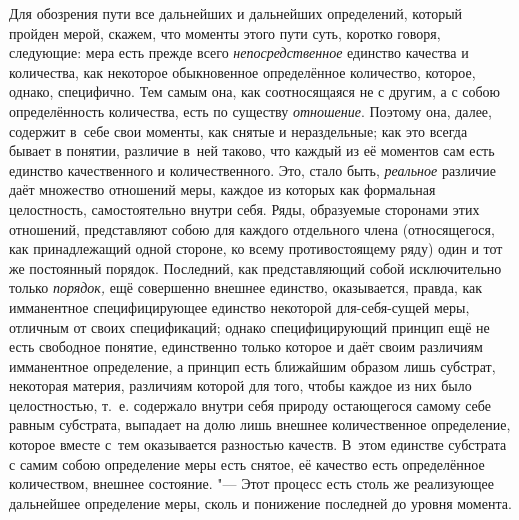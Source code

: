 Для обозрения пути все дальнейших и дальнейших определений, который пройден
мерой, скажем, что моменты этого пути суть, коротко говоря, следующие: мера
есть прежде всего {\em непосредственное} единство качества и количества, как
некоторое обыкновенное определённое количество, которое, однако, специфично.
Тем самым она, как соотносящаяся не с другим, а с собою определённость
количества, есть по существу {\em отношение}. Поэтому она, далее, содержит
в~себе свои моменты, как снятые и нераздельные; как это всегда бывает
в понятии, различие в~ней таково, что каждый из её моментов сам есть единство
качественного и количественного. Это, стало быть, {\em реальное} различие даёт
множество отношений меры, каждое из которых как формальная целостность,
самостоятельно внутри себя. Ряды, образуемые сторонами этих отношений,
представляют собою для каждого отдельного члена (относящегося, как
принадлежащий одной стороне, ко всему противостоящему ряду) один и тот же
постоянный порядок. Последний, как представляющий собой исключительно только
{\em порядок,} ещё совершенно внешнее единство, оказывается, правда, как
имманентное специфицирующее единство некоторой для-себя-сущей меры, отличным
от своих спецификаций; однако специфицирующий принцип ещё не есть свободное
понятие, единственно только которое и даёт своим различиям имманентное
определение, а принцип есть ближайшим образом лишь субстрат, некоторая материя,
различиям которой для того, чтобы каждое из них было целостностью, т.~е.
содержало внутри себя природу остающегося самому себе равным субстрата,
выпадает на долю лишь внешнее количественное определение, которое вместе
с~тем оказывается разностью качеств. В~этом единстве субстрата с самим собою
определение меры есть снятое, её качество есть определённое количеством,
внешнее состояние. "--- Этот процесс есть столь же реализующее дальнейшее
определение меры, сколь и понижение последней до уровня момента.
